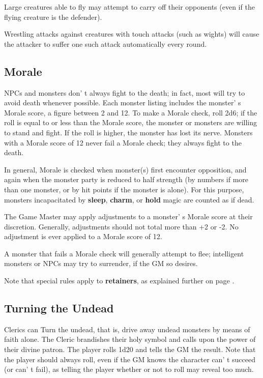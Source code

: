 \documentclass[a4paper,twoside,openany,10pt]{book}
\begin{document}
\begin{multicols}{2}
Large creatures able to fly may attempt to carry off their opponents (even if the flying creature is the defender).

Wrestling attacks against creatures with touch attacks (such as wights) will cause the attacker to suffer one such attack automatically every round.

\subsection{Morale}\label{morale}

NPCs and monsters don' t always fight to the death; in fact, most will try to avoid death whenever possible. Each monster listing includes the monster' s Morale score, a figure between 2 and 12. To make a Morale check, roll 2d6; if the roll is equal to or less than the Morale score, the monster or monsters are willing to stand and fight. If the roll is higher, the monster has lost its nerve. Monsters with a Morale score of 12 never fail a Morale check; they always fight to the death.

In general, Morale is checked when monster(s) first encounter opposition, and again when the monster party is reduced to half strength (by numbers if more than one monster, or by hit points if the monster is alone). For this purpose, monsters incapacitated by \textbf{sleep}, \textbf{charm}, or \textbf{hold }magic are counted as if dead.

The Game Master may apply adjustments to a monster' s Morale score at their discretion. Generally, adjustments should not total more than +2 or -2. No adjustment is ever applied to a Morale score of 12.

A monster that fails a Morale check will generally attempt to flee; intelligent monsters or NPCs may try to surrender, if the GM so desires.

Note that special rules apply to \textbf{retainers}, as explained further on page \hyperlink{retainers}{\pageref{retainers}}.

\subsection{Turning the Undead}\label{turning-the-undead}

Clerics can Turn the undead, that is, drive away undead monsters by means of faith alone. The Cleric brandishes their holy symbol and calls upon the power of their divine patron. The player rolls 1d20 and tells the GM the result. Note that the player should always roll, even if the GM knows the character can' t succeed (or can' t fail), as telling the player whether or not to roll may reveal too much.


\end{multicols}
\end{document}
